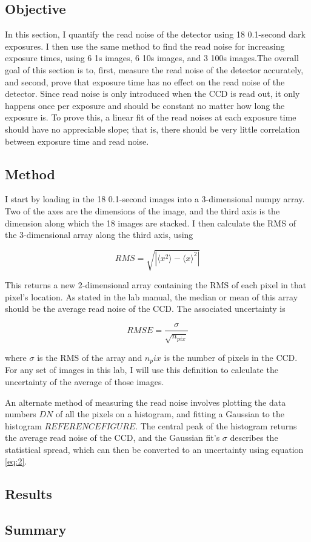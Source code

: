 \documentclass{aastex6}
\begin{document}
\subsection{Objective}
In this section, I quantify the read noise of the detector using 18 0.1-second dark exposures. I then use the same method to find the read noise for increasing exposure times, using 6 1s images, 6 10s images, and 3 100s images.The overall goal of this section is to, first, measure the read noise of the detector accurately, and second, prove that exposure time has no effect on the read noise of the detector. Since read noise is only introduced when the CCD is read out, it only happens once per exposure and should be constant no matter how long the exposure is. To prove this, a linear fit of the read noises at each exposure time should have no appreciable slope; that is, there should be very little correlation between exposure time and read noise.

\subsection{Method}
I start by loading in the 18 0.1-second images into a 3-dimensional numpy array. Two of the axes are the dimensions of the image, and the third axis is the dimension along which the 18 images are stacked. I then calculate the RMS of the 3-dimensional array along the third axis, using

\begin{equation} \label{eq:1}
RMS = \sqrt{|\langle x^2 \rangle-\langle x \rangle^2|}
\end{equation}

This returns a new 2-dimensional array containing the RMS of each pixel in that pixel's location. As stated in the lab manual, the median or mean of this array should be the average read noise of the CCD. The associated uncertainty is

\begin{equation} \label{eq:2}
RMSE = \frac{\sigma}{\sqrt{n_{pix}}}
\end{equation}

where $ \sigma $ is the RMS of the array and $ n_pix $ is the number of pixels in the CCD. For any set of images in this lab, I will use this definition to calculate the uncertainty of the average of those images.
\par
An alternate method of measuring the read noise involves plotting the data numbers \(DN\) of all the pixels on a histogram, and fitting a Gaussian to the histogram \(REFERENCE FIGURE\). The central peak of the histogram returns the average read noise of the CCD, and the Gaussian fit's $ \sigma $ describes the statistical spread, which can then be converted to an uncertainty using equation \ref{eq:2}.

\subsection{Results}

\subsection{Summary}
\end{document}

